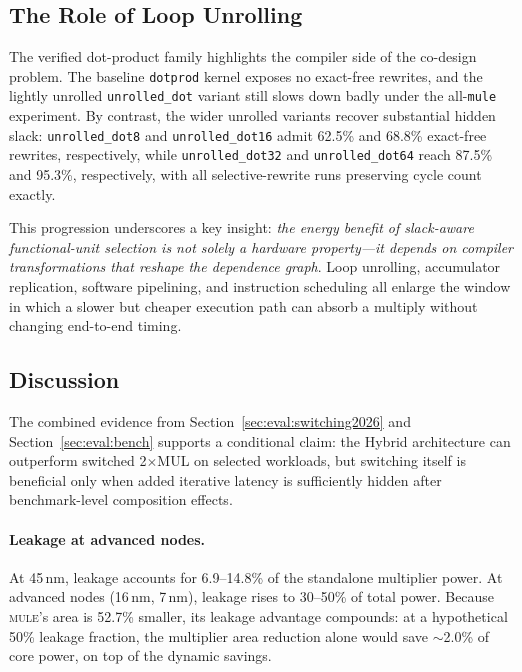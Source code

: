 \subsection{The Role of Loop Unrolling}\label{sec:eval:unrolling}

The verified dot-product family highlights the compiler side of the
co-design problem. The baseline \texttt{dotprod} kernel exposes no
exact-free rewrites, and the lightly unrolled \texttt{unrolled\_dot}
variant still slows down badly under the all-\texttt{mule} experiment.
By contrast, the wider unrolled variants recover substantial hidden
slack: \texttt{unrolled\_dot8} and \texttt{unrolled\_dot16} admit
62.5\% and 68.8\% exact-free rewrites, respectively, while
\texttt{unrolled\_dot32} and
\texttt{unrolled\_dot64} reach 87.5\% and 95.3\%, respectively, with
all selective-rewrite runs preserving cycle count exactly.

This progression underscores a key insight: \emph{the energy benefit of
slack-aware functional-unit selection is not solely a hardware
property---it depends on compiler transformations that reshape the
dependence graph}. Loop unrolling, accumulator replication, software
pipelining, and instruction scheduling all enlarge the window in which
a slower but cheaper execution path can absorb a multiply without
changing end-to-end timing.

\subsection{Discussion}\label{sec:eval:discussion}

The combined evidence from Section~\ref{sec:eval:switching2026} and
Section~\ref{sec:eval:bench} supports a conditional claim: the Hybrid
architecture can outperform switched 2$\times$MUL on selected workloads,
but switching itself is beneficial only when added iterative latency is
sufficiently hidden after benchmark-level composition effects.

\paragraph{Leakage at advanced nodes.}
At 45\,nm, leakage accounts for 6.9--14.8\% of the standalone
multiplier power. At advanced nodes (16\,nm, 7\,nm), leakage rises to
30--50\% of total power. Because \textsc{mule}'s area is 52.7\%
smaller, its leakage advantage compounds: at a hypothetical 50\%
leakage fraction, the multiplier area reduction alone would save
$\sim$2.0\% of core power, on top of the dynamic savings.

